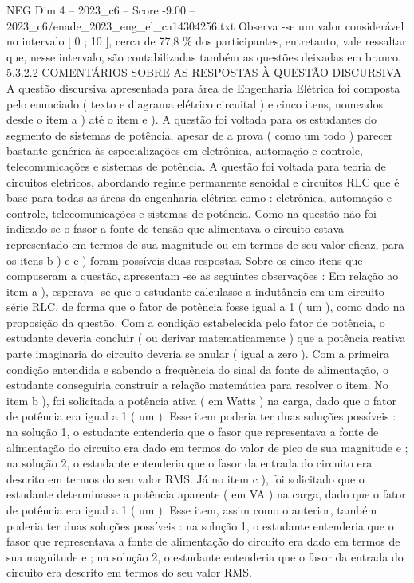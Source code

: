 \begin{textsample}{NEG Dim 4 – 2023\_c6 – Score -9.00 – 2023\_c6/enade\_2023\_eng\_el\_ca14304256.txt}
Observa -se um valor considerável no intervalo [ 0 ; 10 ], cerca de 77,8 \% dos participantes, entretanto, vale ressaltar que, nesse intervalo, são contabilizadas também as questões deixadas em branco. 5.3.2.2 COMENTÁRIOS SOBRE AS RESPOSTAS À QUESTÃO DISCURSIVA A questão discursiva apresentada para área de Engenharia Elétrica foi composta pelo enunciado ( texto e diagrama elétrico circuital ) e cinco itens, nomeados desde o item a ) até o item e ).
A questão foi voltada para os estudantes do segmento de sistemas de potência, apesar de a prova ( como um todo ) parecer bastante genérica às especializações em eletrônica, automação e controle, telecomunicações e sistemas de potência.
A questão foi voltada para teoria de circuitos eletricos, abordando regime permanente senoidal e circuitos RLC que é base para todas as áreas da engenharia elétrica como : eletrônica, automação e controle, telecomunicações e sistemas de potência.
Como na questão não foi indicado se o fasor a fonte de tensão que alimentava o circuito estava representado em termos de sua magnitude ou em termos de seu valor eficaz, para os itens b ) e c ) foram possíveis duas respostas.
Sobre os cinco itens que compuseram a questão, apresentam -se as seguintes observações : Em relação ao item a ), esperava -se que o estudante calculasse a indutância em um circuito série RLC, de forma que o fator de potência fosse igual a 1 ( um ), como dado na proposição da questão.
Com a condição estabelecida pelo fator de potência, o estudante deveria concluir ( ou derivar matematicamente ) que a potência reativa parte imaginaria do circuito deveria se anular ( igual a zero ).
Com a primeira condição entendida e sabendo a frequência do sinal da fonte de alimentação, o estudante conseguiria construir a relação matemática para resolver o item.
No item b ), foi solicitada a potência ativa ( em Watts ) na carga, dado que o fator de potência era igual a 1 ( um ).
Esse item poderia ter duas soluções possíveis : na solução 1, o estudante entenderia que o fasor que representava a fonte de alimentação do circuito era dado em termos do valor de pico de sua magnitude e ; na solução 2, o estudante entenderia que o fasor da entrada do circuito era descrito em termos do seu valor RMS.
Já no item c ), foi solicitado que o estudante determinasse a potência aparente ( em VA ) na carga, dado que o fator de potência era igual a 1 ( um ).
Esse item, assim como o anterior, também poderia ter duas soluções possíveis : na solução 1, o estudante entenderia que o fasor que representava a fonte de alimentação do circuito era dado em termos de sua magnitude e ; na solução 2, o estudante entenderia que o fasor da entrada do circuito era descrito em termos do seu valor RMS.

\end{textsample}
